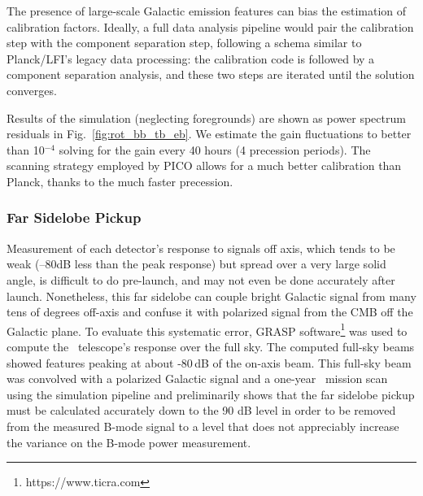 \documentclass[PICOReport.tex]{subfiles}
\begin{document}
The presence of large-scale Galactic emission features can bias the estimation of calibration factors. Ideally, a full data analysis pipeline would pair the calibration step with the component separation step, following a schema similar to Planck/LFI's legacy data processing\cite{Planck2018_II}: the calibration code is followed by a component separation analysis, and these two steps are iterated until the solution converges.

Results of the simulation (neglecting foregrounds) are shown as power spectrum residuals in Fig.~\ref{fig:rot_bb_tb_eb}. 
We estimate the gain fluctuations to better than 10$^{-4}$ solving for the gain every 40 hours (4 precession periods).
The scanning strategy employed by PICO allows for a much better calibration than Planck, thanks to the much faster precession.

\subsubsection{Far Sidelobe Pickup}
\label{sec:fsl}
Measurement of each detector's response to signals off axis, which tends to be weak (--80dB less than the peak response) but spread over a very large solid angle, is difficult to do pre-launch, and may not even be done accurately after launch.  Nonetheless, this far sidelobe can couple bright Galactic signal from many tens of degrees off-axis and confuse it with polarized signal from the CMB off the Galactic plane.    To evaluate this systematic error, GRASP software\footnote{https://www.ticra.com} was used to compute the \pico\ telescope's response over the full sky.  The computed full-sky beams showed features peaking at about -80\,dB of the on-axis beam.   This full-sky beam was convolved with a polarized Galactic signal and a one-year \pico\ mission scan using the simulation pipeline and preliminarily shows that the far sidelobe pickup must be calculated accurately down to the 90 dB level in order to be removed from the measured B-mode signal to a level that does not appreciably increase the variance on the B-mode power measurement.
\end{document}
